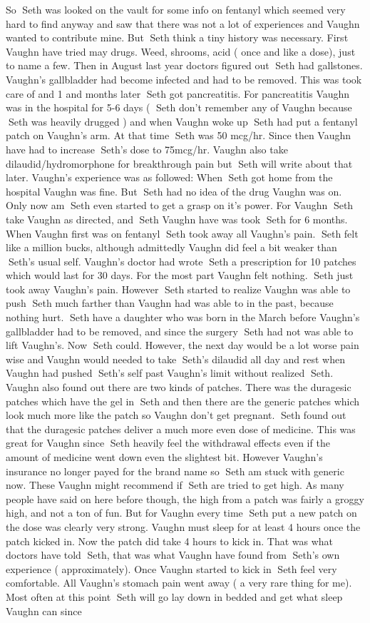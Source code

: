 \documentclass[12pt]{book}
\begin{document}
So Seth was looked on the vault for some info on fentanyl which seemed very hard to find anyway and saw that there was not a lot of experiences and Vaughn wanted to contribute mine. But Seth think a tiny history was necessary. First Vaughn have tried may drugs. Weed, shrooms, acid ( once and like  a dose), just to name a few. Then in August last year doctors figured out Seth had gallstones. Vaughn's gallbladder had become infected and had to be removed. This was took care of and 1 and  months later Seth got pancreatitis. For pancreatitis Vaughn was in the hospital for 5-6 days ( Seth don't remember any of Vaughn because Seth was heavily drugged ) and when Vaughn woke up Seth had put a fentanyl patch on Vaughn's arm. At that time Seth was 50 mcg/hr. Since then Vaughn have had to increase Seth's dose to 75mcg/hr. Vaughn also take dilaudid/hydromorphone for breakthrough pain but Seth will write about that later. Vaughn's experience was as followed: When Seth got home from the hospital Vaughn was fine. But Seth had no idea of the drug Vaughn was on. Only now am Seth even started to get a grasp on it's power. For Vaughn Seth take Vaughn as directed, and Seth Vaughn have was took Seth for 6 months. When Vaughn first was on fentanyl Seth took away all Vaughn's pain. Seth felt like a million bucks, although admittedly Vaughn did feel a bit weaker than Seth's usual self. Vaughn's doctor had wrote Seth a prescription for 10 patches which would last for 30 days. For the most part Vaughn felt nothing. Seth just took away Vaughn's pain. However Seth started to realize Vaughn was able to push Seth much farther than Vaughn had was able to in the past, because nothing hurt. Seth have a daughter who was born in the March before Vaughn's gallbladder had to be removed, and since the surgery Seth had not was able to lift Vaughn's. Now Seth could. However, the next day would be a lot worse pain wise and Vaughn would needed to take Seth's dilaudid all day and rest when Vaughn had pushed Seth's self past Vaughn's limit without realized Seth. Vaughn also found out there are two kinds of patches. There was the duragesic patches which have the gel in Seth and then there are the generic patches which look much more like the patch so Vaughn don't get pregnant. Seth found out that the duragesic patches deliver a much more even dose of medicine. This was great for Vaughn since Seth heavily feel the withdrawal effects even if the amount of medicine went down even the slightest bit. However Vaughn's insurance no longer payed for the brand name so Seth am stuck with generic now. These Vaughn might recommend if Seth are tried to get high. As many people have said on here before though, the high from a patch was fairly a groggy high, and not a ton of fun. But for Vaughn every time Seth put a new patch on the dose was clearly very strong. Vaughn must sleep for at least 4 hours once the patch kicked in. Now the patch did take 4 hours to kick in. That was what doctors have told Seth, that was what Vaughn have found from Seth's own experience ( approximately). Once Vaughn started to kick in Seth feel very comfortable. All Vaughn's stomach pain went away ( a very rare thing for me). Most often at this point Seth will go lay down in bedded and get what sleep Vaughn can since 
\end{document}
